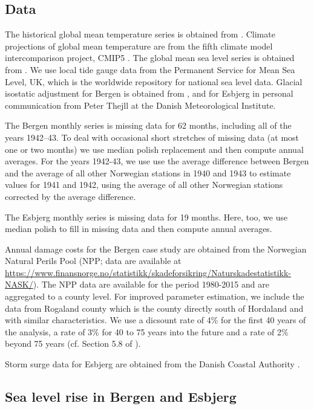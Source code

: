 \documentclass[draft,linenumbers]{agujournal}
\begin{document}
\subsection{Data}
The historical global mean temperature series is obtained from \citet{giss}. Climate projections of global mean temperature are from the fifth climate model intercomparison project, CMIP5 \citep{cmip5}. The global mean sea level series is obtained from \citet{csiro}. We use local tide gauge data from the Permanent Service for Mean Sea Level, UK, which is the worldwide repository for national sea level data. Glacial isostatic adjustment for Bergen is obtained from \citet{Simpson2014}, and for Esbjerg in personal communication from Peter Thejll at the Danish Meteorological Institute. 

The Bergen monthly series is missing data for 62 months, including all of the years 1942--43. To deal with occasional short stretches of missing data (at most one or two months) we use median polish replacement \citep{medpol} and then compute annual averages. For the years 1942-43, we use use the average difference between Bergen and the average of all other Norwegian stations in 1940 and 1943 to estimate values for 1941 and 1942, using the average of all other Norwegian stations corrected by the average difference. 

The Esbjerg monthly series is missing data for 19 months. Here, too, we use median polish to fill in missing data and then compute annual averages.

Annual damage costs for the Bergen case study are obtained from the Norwegian Natural Perils Pool (NPP;  data are available at \url{https://www.finansnorge.no/statistikk/skadeforsikring/Naturskadestatistikk-NASK/}). The NPP data are available for the period 1980-2015 and are aggregated to a county level. For improved parameter estimation, we include the data from Rogaland county which is the county directly south of Hordaland and with similar characteristics. We use a dicsount rate of 4\% for the first 40 years of the analysis, a rate of 3\% for 40 to 75 years into the future and a rate of 2\% beyond 75 years (cf. Section 5.8 of \citet{DiscountRate}).  

Storm surge data for Esbjerg are obtained from the Danish Coastal Authority \citep{sealevel2012}.

\subsection{Sea level rise in Bergen and Esbjerg}
\end{document}
